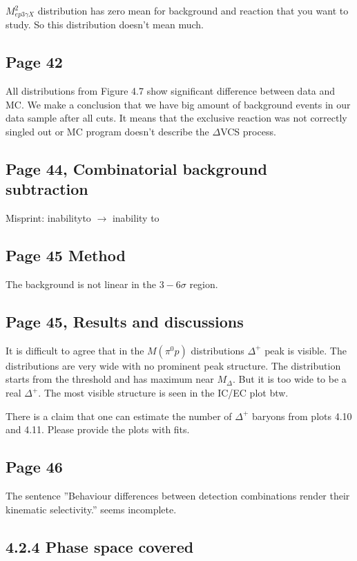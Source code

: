 \documentclass[11pt]{paper}
\begin{document}
$M^2_{ep3\gamma X}$ distribution has zero mean for background and reaction that you want to study. So this distribution doesn't mean much.
  
\subsection*{Page 42}

All distributions from Figure 4.7 show significant difference between data and MC. 
We  make a conclusion that we have big amount of background events in our data sample after all cuts.  
It means that the exclusive reaction was not correctly singled out or MC program doesn't describe the $\Delta$VCS process. 

\subsection*{Page 44, Combinatorial background subtraction}
Misprint: inabilityto $\rightarrow$ inability to

\subsection*{Page 45 Method}

The background is not linear in the $3-6\sigma$ region.

\subsection*{Page 45, Results and discussions}
It is difficult to agree that in the $M(\pi^0p)$ distributions $\Delta^+$ peak is visible. 
The distributions are very wide with no prominent peak structure. 
The distribution starts from the threshold and has maximum near  $M_\Delta$. But it is too wide to be a real $\Delta^+$. The most visible structure is seen in the IC/EC plot btw.

There is a claim that one can estimate the number of $\Delta^+$ baryons from plots 4.10 and 4.11.
Please provide the plots with fits.

\subsection*{Page 46}
The sentence ''Behaviour differences between detection combinations render their kinematic selectivity.'' seems incomplete.

\subsection*{4.2.4 Phase space covered}
\end{document}
